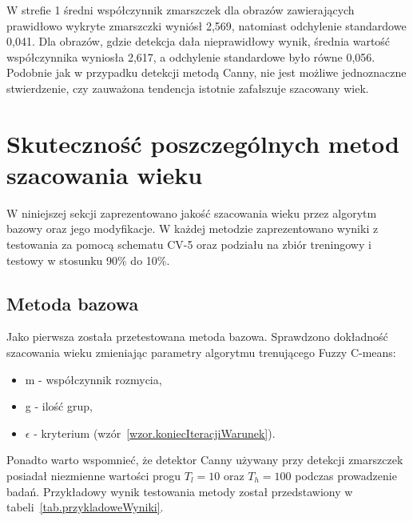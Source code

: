 \documentclass[a4paper,twoside,12pt]{book}
\begin{document}
    W strefie 1 średni współczynnik zmarszczek dla obrazów zawierających prawidłowo wykryte zmarszczki wyniósł 2,569,
    natomiast odchylenie standardowe 0,041. Dla obrazów, gdzie detekcja dała nieprawidłowy wynik, średnia wartość
    współczynnika wyniosła 2,617, a odchylenie standardowe było równe 0,056.
    Podobnie jak w przypadku detekcji metodą Canny, nie jest możliwe jednoznaczne stwierdzenie, czy zauważona
    tendencja istotnie zafałszuje szacowany wiek.
    \section{Skuteczność poszczególnych metod szacowania wieku}\label{sec:skuteczność-poszczególnych-metod-szacowania-wieku}
    W niniejszej sekcji zaprezentowano jakość szacowania wieku przez algorytm bazowy oraz jego modyfikacje. W każdej
    metodzie zaprezentowano wyniki z testowania za pomocą schematu CV-5 oraz podziału na zbiór treningowy i testowy w
    stosunku 90\% do 10\%.
    \subsection{Metoda bazowa}\label{subsec:metoda-bazowa}
    Jako pierwsza została przetestowana metoda bazowa.
    Sprawdzono dokładność szacowania wieku zmieniając parametry algorytmu trenującego Fuzzy C-means:
    \begin{itemize}
        \item m - współczynnik rozmycia,
        \item g - ilość grup,
        \item $\epsilon$ - kryterium (wzór~\ref{wzor.koniecIteracjiWarunek}).
    \end{itemize}
    Ponadto warto wspomnieć, że detektor Canny używany przy detekcji zmarszczek posiadał niezmienne wartości progu
    $T_{l} = 10$ oraz $T_{h} = 100$ podczas prowadzenie badań.
    Przykładowy wynik testowania metody został przedstawiony w tabeli~\ref{tab.przykladoweWyniki}.
\end{document}
